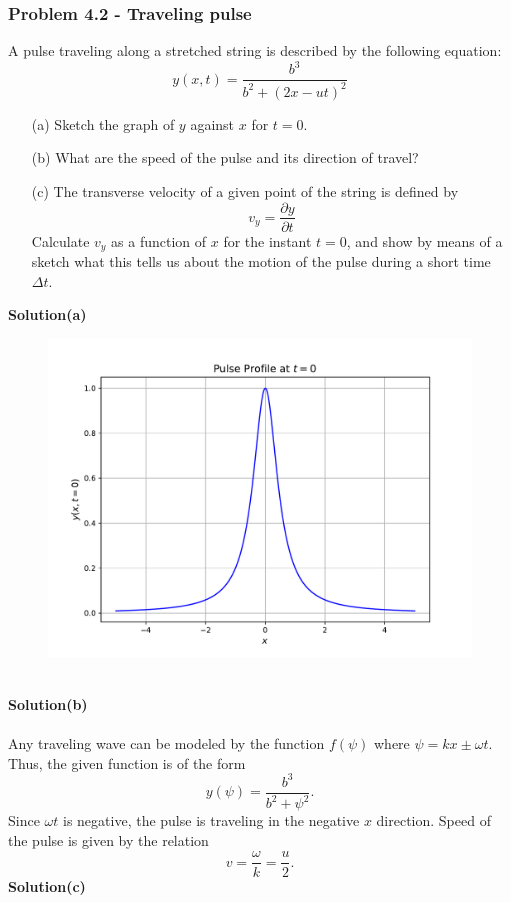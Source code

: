 \documentclass[12pt,a4paper]{article}
\begin{document}
\subsubsection*{Problem 4.2 - Traveling pulse}
A pulse traveling along a stretched string is described by the following equation:
\[y(x,t)=\frac{b^3}{b^2+(2x-ut)^2}\]
\begin{enumerate}
    \item[(a)]Sketch the graph of $y$ against $x$ for $t=0$.
    \item[(b)]What are the speed of the pulse and its direction of travel?
    \item[(c)]The transverse velocity of a given point of the string is defined by
    \[v_y=\frac{\partial y}{\partial t}\]
    Calculate $v_y$ as a function of $x$ for the instant $t=0$, and show by means of a sketch what this tells us about the motion of the pulse during a short time $\Delta t$.
\end{enumerate}
\textbf{Solution(a)}
\begin{figure}[h]
    \centering
    \includegraphics[width=0.879\linewidth]{figs/fig_sol_4.2a.pdf}
\end{figure}
\\\textbf{Solution(b)}
\\
\\Any traveling wave can be modeled by the function $f(\psi)$ where $\psi=kx\pm\omega t$. Thus, the given function is of the form
\[y(\psi)=\frac{b^3}{b^2+\psi^2}.\]
Since $\omega t$ is negative, the pulse is traveling in the negative $x$ direction. Speed of the pulse is given by the relation
\[v=\frac{\omega}{k}=\frac{u}{2}.\]
\textbf{Solution(c)}
\\
\end{document}

